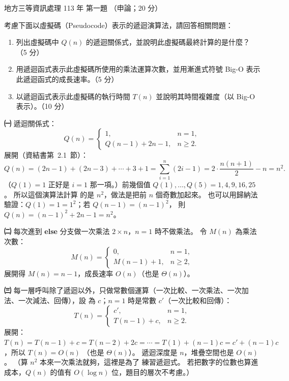 \begin{pastexam}[label={px:df3-113-ds-01}]{地方三等資訊處理 113 年 第一題}
（申論；20 分）

考慮下面以虛擬碼（Pseudocode）表示的遞迴演算法，請回答相關問題：
\begin{center}
\end{center}
\begin{enumerate}[leftmargin=2.6em, labelsep=0.4em]
\item[㈠] 列出虛擬碼中 $Q(n)$ 的遞迴關係式，並說明此虛擬碼最終計算的是什麼？（5 分）
\item[㈡] 用遞迴函式表示此虛擬碼所使用的乘法運算次數，並用漸進式符號 Big-O 表示此遞迴函式的成長速率。（5 分）
\item[㈢] 以遞迴函式表示此虛擬碼的執行時間 $T(n)$ 並說明其時間複雜度（以 Big-O 表示）。（10 分）
\end{enumerate}
\end{pastexam}

\begin{pastsoln}
\textbf{㈠} 遞迴關係式：
\[
Q(n) = \begin{cases} 1, & n = 1, \\ Q(n-1) + 2n - 1, & n \ge 2. \end{cases}
\]
展開（資結書第~2.1~節）：
\[
Q(n) = (2n - 1) + (2n - 3) + \cdots + 3 + 1 = \sum_{i=1}^{n} (2i - 1) = 2 \cdot \frac{n(n+1)}{2} - n = n^2 .
\]
（$Q(1) = 1$ 正好是 $i = 1$ 那一項。）前幾個值 $Q(1), \ldots, Q(5) = 1, 4, 9, 16, 25$。 所以這個演算法計算
的是 $n^2$，做法是把前 $n$ 個奇數加起來。 也可以用歸納法驗證：$Q(1) = 1 = 1^2$；若 $Q(n-1) = (n-1)^2$，
則 $Q(n) = (n-1)^2 + 2n - 1 = n^2$。

\textbf{㈡} 每次進到 \textbf{else} 分支做一次乘法 $2 \times n$，$n = 1$ 時不做乘法。 令 $M(n)$ 為乘法次數：
\[
M(n) = \begin{cases} 0, & n = 1, \\ M(n-1) + 1, & n \ge 2, \end{cases}
\]
展開得 $M(n) = n - 1$，成長速率 $O(n)$（也是 $\Theta(n)$）。

\textbf{㈢} 每一層呼叫除了遞迴以外，只做常數個運算（一次比較、一次乘法、一次加法、一次減法、回傳），設
為 $c$；$n = 1$ 時是常數 $c'$（一次比較和回傳）：
\[
T(n) = \begin{cases} c', & n = 1, \\ T(n-1) + c, & n \ge 2. \end{cases}
\]
展開：$T(n) = T(n-1) + c = T(n-2) + 2c = \cdots = T(1) + (n-1)c = c' + (n-1)c$，所以 $T(n) = O(n)$
（也是 $\Theta(n)$）。 遞迴深度是 $n$，堆疊空間也是 $O(n)$。 （算 $n^2$ 本來一次乘法就夠，這裡是為了
練習遞迴式。 若把數字的位數也算進成本，$Q(n)$ 的值有 $O(\log n)$ 位，題目的層次不考慮。）
\end{pastsoln}
